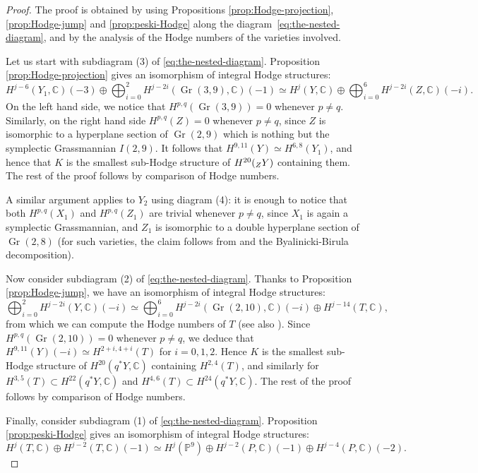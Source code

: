 \documentclass[11pt]{article}
\newcommand{\NoChangel}[1]{%
\expandafter\let\csname old\string#1\endcsname=#1
\let#1=\relax
\newcommand{#1}{\mathcode`l="716C\csname old\string#1\endcsname\mathcode`l="7160 }%
}
\newcommand{\Bl}{\mathrm{Bl}}\NoChangel{\Bl}
\theoremstyle{plain}
\theoremstyle{definition}
\DeclareMathOperator{\Gr}{Gr}
\newcommand{\CC}{\mathbb{C}}
\newcommand{\PP}{\mathbb{P}}
\begin{document}
\begin{proof}
The proof is obtained by using Propositions \ref{prop:Hodge-projection}, \ref{prop:Hodge-jump} and
\ref{prop:peski-Hodge} along the diagram~\eqref{eq:the-nested-diagram}, and by the analysis of the Hodge numbers of the varieties involved.

Let us start with subdiagram (3) of \eqref{eq:the-nested-diagram}. Proposition \ref{prop:Hodge-projection} gives an isomorphism of integral Hodge structures:
\[
H^{j-6}(Y_1,\CC)(-3) \oplus \bigoplus_{i=0}^2 H^{j-2i}(\Gr(3,9),\CC)(-1) \simeq
H^j(Y,\CC) \oplus \bigoplus_{i=0}^{6}H^{j-2i}(Z,\CC)(-i).
\]
On the left hand side, we notice that $H^{p,q}(\Gr(3,9))=0$ whenever $p \neq q$.
Similarly, on the right hand side $H^{p,q}(Z)=0$ whenever $p \neq q$, since $Z$ is isomorphic to a hyperplane
section of $\Gr(2,9)$ which is nothing but the symplectic Grassmannian $I(2,9)$.
It follows that $H^{9,11}(Y) \simeq H^{6,8}(Y_1)$, and hence that $K$ is the smallest sub-Hodge structure
of $H^{20}(\Bl_Z Y)$ containing them. The rest of the proof follows by comparison of Hodge numbers.

A similar argument applies to $Y_2$ using diagram (4): it is enough to notice that both $H^{p,q}(X_1)$ and $H^{p,q}(Z_1)$ are trivial
whenever $p \neq q$, since $X_1$ is again a symplectic Grassmannian,
and $Z_1$ is isomorphic to a double hyperplane section of $\Gr(2,8)$
(for such varieties, the claim follows from \cite[2.10]{vlad-bi} and the Byalinicki-Birula
decomposition).

Now consider subdiagram (2) of \eqref{eq:the-nested-diagram}. Thanks to Proposition \ref{prop:Hodge-jump}, we have an isomorphism of integral Hodge structures:
\begin{equation*}\label{eq:hodge-Y-and-T}
\bigoplus_{i=0}^2 H^{j-2i}(Y,\CC)(-i) \simeq \bigoplus_{i=0}^6 H^{j-2i}(\Gr(2,10),\CC)(-i) \oplus H^{j-14}(T,\CC),
\end{equation*}
from which we can compute the Hodge numbers of $T$ (see also \cite[Prop.\,3.27]{fm}).
Since $H^{p,q}(\Gr(2,10))=0$ whenever $p\neq q$, we deduce that $H^{9,11}(Y)(-i) \simeq H^{2+i,4+i}(T)$ for $i=0,1,2$. Hence $K$ is the smallest sub-Hodge structure of $H^{20}(q^* Y,\CC)$ containing $H^{2,4}(T)$, and similarly for $H^{3,5}(T) \subset H^{22}(q^*Y,\CC)$ and $H^{4,6}(T) \subset H^{24}(q^*Y,\CC)$.
The rest of the proof follows by comparison of Hodge numbers.

Finally, consider subdiagram (1) of \eqref{eq:the-nested-diagram}. Proposition \ref{prop:peski-Hodge} gives an isomorphism of integral Hodge structures:
\begin{equation*}\label{eq:hodge-P-and-T}
H^j(T,\CC) \oplus H^{j-2}(T,\CC)(-1) \simeq H^j(\PP^9) \oplus H^{j-2}(P,\CC)(-1) \oplus H^{j-4}(P,\CC)(-2).
\end{equation*}


\end{proof}
\end{document}
